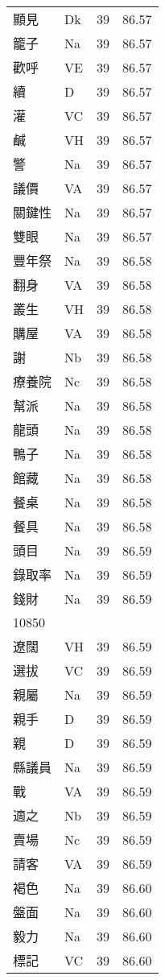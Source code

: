 \documentclass[twocolumn]{book}
\begin{document}
\begin{supertabular}{llrr}
顯見 & Dk & 39 &  86.57\\
籠子 & Na & 39 &  86.57\\
歡呼 & VE & 39 &  86.57\\
續 & D & 39 &  86.57\\
灌 & VC & 39 &  86.57\\
鹹 & VH & 39 &  86.57\\
警 & Na & 39 &  86.57\\
議價 & VA & 39 &  86.57\\
關鍵性 & Na & 39 &  86.57\\
雙眼 & Na & 39 &  86.57\\
豐年祭 & Na & 39 &  86.58\\
翻身 & VA & 39 &  86.58\\
叢生 & VH & 39 &  86.58\\
購屋 & VA & 39 &  86.58\\
謝 & Nb & 39 &  86.58\\
療養院 & Nc & 39 &  86.58\\
幫派 & Na & 39 &  86.58\\
龍頭 & Na & 39 &  86.58\\
鴨子 & Na & 39 &  86.58\\
館藏 & Na & 39 &  86.58\\
餐桌 & Na & 39 &  86.58\\
餐具 & Na & 39 &  86.58\\
頭目 & Na & 39 &  86.59\\
錄取率 & Na & 39 &  86.59\\
錢財 & Na & 39 &  86.59\\
10850\\
遼闊 & VH & 39 &  86.59\\
選拔 & VC & 39 &  86.59\\
親屬 & Na & 39 &  86.59\\
親手 & D & 39 &  86.59\\
親 & D & 39 &  86.59\\
縣議員 & Na & 39 &  86.59\\
戰 & VA & 39 &  86.59\\
適之 & Nb & 39 &  86.59\\
賣場 & Nc & 39 &  86.59\\
請客 & VA & 39 &  86.59\\
褐色 & Na & 39 &  86.60\\
盤面 & Na & 39 &  86.60\\
毅力 & Na & 39 &  86.60\\
標記 & VC & 39 &  86.60\\

\end{supertabular}
\end{document}
